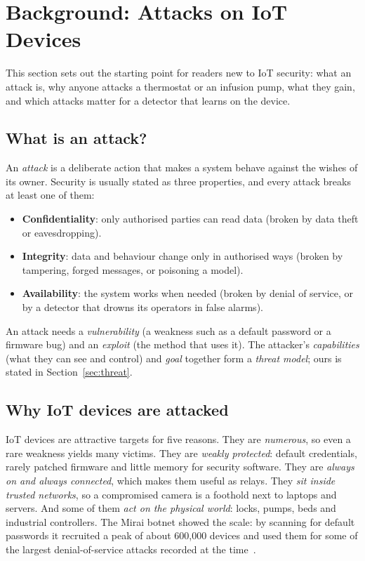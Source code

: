 \section{Background: Attacks on IoT Devices}\label{sec:background}

This section sets out the starting point for readers new to IoT security: what an attack is, why anyone
attacks a thermostat or an infusion pump, what they gain, and which attacks matter for a detector that
learns on the device.

\subsection{What is an attack?}
An \emph{attack} is a deliberate action that makes a system behave against the wishes of its owner. Security
is usually stated as three properties, and every attack breaks at least one of them:
\begin{itemize}
\item \textbf{Confidentiality}: only authorised parties can read data (broken by data theft or eavesdropping).
\item \textbf{Integrity}: data and behaviour change only in authorised ways (broken by tampering, forged
  messages, or poisoning a model).
\item \textbf{Availability}: the system works when needed (broken by denial of service, or by a detector
  that drowns its operators in false alarms).
\end{itemize}
An attack needs a \emph{vulnerability} (a weakness such as a default password or a firmware bug) and an
\emph{exploit} (the method that uses it). The attacker's \emph{capabilities} (what they can see and
control) and \emph{goal} together form a \emph{threat model}; ours is stated in Section~\ref{sec:threat}.

\subsection{Why IoT devices are attacked}
IoT devices are attractive targets for five reasons. They are \emph{numerous}, so even a rare weakness
yields many victims. They are \emph{weakly protected}: default credentials, rarely patched firmware and
little memory for security software. They are \emph{always on and always connected}, which makes them
useful as relays. They \emph{sit inside trusted networks}, so a compromised camera is a foothold next to
laptops and servers. And some of them \emph{act on the physical world}: locks, pumps, beds and industrial
controllers. The Mirai botnet showed the scale: by scanning for default passwords it recruited a peak of
about 600,000 devices and used them for some of the largest denial-of-service attacks recorded at the
time~\cite{mirai}.

